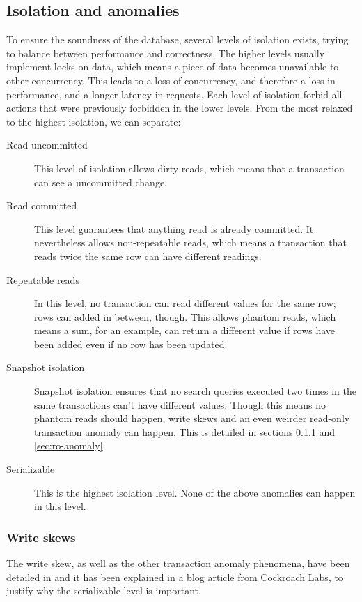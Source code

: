 \subsection{Isolation and anomalies}
\label{sec:isolation}
To ensure the soundness of the database, several levels of isolation exists, trying to balance between performance and correctness. The higher levels usually implement locks on data, which means a piece of data becomes unavailable to other concurrency. This leads to a loss of concurrency, and therefore a loss in performance, and a longer latency in requests. Each level of isolation forbid all actions that were previously forbidden in the lower levels.
From the most relaxed to the highest isolation, we can separate:
\begin{description}
\item[Read uncommitted] This level of isolation allows dirty reads, which means that a transaction can see a uncommitted change.
\item[Read committed] This level guarantees that anything read is already committed. It nevertheless allows non-repeatable reads, which means a transaction that reads twice the same row can have different readings.
\item[Repeatable reads] In this level, no transaction can read different values for the same row; rows can added in between, though. This allows phantom reads, which means a sum, for an example, can return a different value if rows have been added even if no row has been updated.
\item[Snapshot isolation] Snapshot isolation ensures that no search queries executed two times in the same transactions can't have different values. Though this means no phantom reads should happen, write skews and an even weirder read-only transaction anomaly can happen. This is detailed in sections \ref{sec:ws} and \ref{sec:ro-anomaly}.
\item[Serializable] This is the highest isolation level. None of the above anomalies can happen in this level.
\end{description}


\subsubsection{Write skews}
\label{sec:ws}

The write skew, as well as the other transaction anomaly phenomena, have been detailed in \cite{DBLP:journals/corr/abs-cs-0701157} and it has been explained in a blog article from Cockroach Labs\cite{CRDB:write-skew}, to justify why the serializable level is important.


